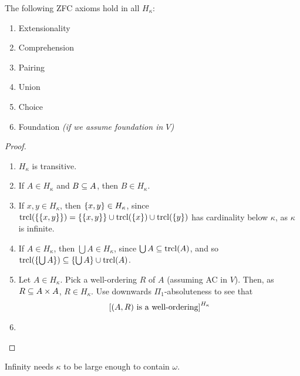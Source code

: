 \begin{boxlemma}
    The following ZFC axioms hold in all $H_{\kappa}$:
    \begin{enumerate}
        \item Extensionality
        \item Comprehension
        \item Pairing
        \item Union
        \item Choice
        \item Foundation \textit{(if we assume foundation in $V$)}
    \end{enumerate}
\end{boxlemma}
\begin{proof} \hfill
    \begin{enumerate}
        \item $H_{\kappa}$ is transitive.
        \item If $A \in H_{\kappa}$ and $B \subseteq A$, then $B \in H_{\kappa}$.
        \item If $x, y \in H_{\kappa}$, then $\left\{ x, y \right\} \in H_{\kappa}$, since $\operatorname{trcl}\!\left( \left\{ \left\{ x, y \right\} \right\} \right) = \left\{ \left\{ x, y \right\} \right\} \cup \operatorname{trcl}\!\left( \left\{ x \right\} \right) \cup \operatorname{trcl}\!\left( \left\{ y \right\} \right)$ has cardinality below $\kappa$, as $\kappa$ is infinite.
        \item If $A \in H_{\kappa}$, then $\bigcup A \in H_{\kappa}$, since $\bigcup A \subseteq \operatorname{trcl}\!\left( A \right)$, and so $\operatorname{trcl}\!\left( \left\{ \bigcup A \right\} \right) \subseteq \left\{ \bigcup A \right\} \cup \operatorname{trcl}\!\left( A \right)$.
        \item Let $A \in H_{\kappa}$. Pick a well-ordering $R$ of $A$ (assuming AC in $V$). Then, as $R \subseteq A \times A$, $R \in H_{\kappa}$. Use downwards $\Pi_1$-absoluteness to see that
        \begin{align*}
            \left[ (A, R) \text{ is a well-ordering} \right]^{H_{\kappa}}
        \end{align*}
        \item \sorry
    \end{enumerate}
\end{proof}

Infinity needs $\kappa$ to be large enough to contain $\omega$.

